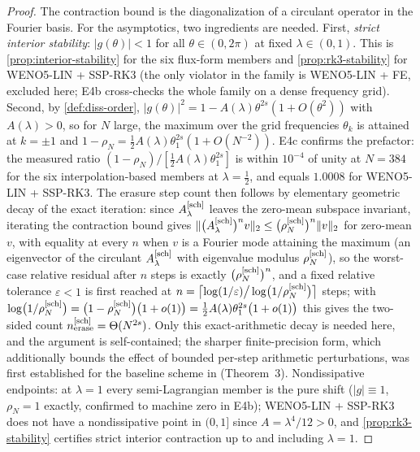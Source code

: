 \documentclass[pdflatex,sn-mathphys-num]{sn-jnl}%
\theoremstyle{thmstyleone}%
\theoremstyle{thmstyletwo}%
\theoremstyle{thmstylethree}%
\newcommand{\Asch}{A^{[\rm sch]}_\lambda}
\begin{document}
\begin{proof}
The contraction bound is the diagonalization of a circulant operator in the Fourier basis.
For the asymptotics, two ingredients are needed.
First, \emph{strict interior stability}: $|g(\theta)|<1$ for all $\theta\in(0,2\pi)$ at fixed $\lambda\in(0,1)$.
This is \cref{prop:interior-stability} for the six flux-form members and \cref{prop:rk3-stability} for WENO5-LIN + SSP-RK3 (the only violator in the family is WENO5-LIN + FE, excluded here; E4b cross-checks the whole family on a dense frequency grid).
Second, by \cref{def:diss-order}, $|g(\theta)|^2=1-A(\lambda)\theta^{2s}(1+O(\theta^2))$ with $A(\lambda)>0$, so for $N$ large, the maximum over the grid frequencies $\theta_k$ is attained at $k=\pm1$ and $1-\rho_N=\tfrac12A(\lambda)\theta_1^{2s}(1+O(N^{-2}))$.
E4c confirms the prefactor: the measured ratio $(1-\rho_N)/[\tfrac12A(\lambda)\theta_1^{2s}]$ is within $10^{-4}$ of unity at $N=384$ for the six interpolation-based members at $\lambda=\tfrac12$, and equals $1.0008$ for WENO5-LIN + SSP-RK3.
The erasure step count then follows by elementary geometric decay of the exact iteration: since $\Asch$ leaves the zero-mean subspace invariant, iterating the contraction bound gives $\|\bigl(\Asch\bigr)^{n}v\|_2\le\bigl(\rho_N^{[\rm sch]}\bigr)^{n}\|v\|_2$ for zero-mean $v$, with equality at every $n$ when $v$ is a Fourier mode attaining the maximum (an eigenvector of the circulant $\Asch$ with eigenvalue modulus $\rho_N^{[\rm sch]}$), so the worst-case relative residual after $n$ steps is exactly $\bigl(\rho_N^{[\rm sch]}\bigr)^{n}$, and a fixed relative tolerance $\varepsilon<1$ is first reached at $n=\bigl\lceil\log(1/\varepsilon)\big/\log\bigl(1/\rho_N^{[\rm sch]}\bigr)\bigr\rceil$ steps; with $\log\bigl(1/\rho_N^{[\rm sch]}\bigr)=\bigl(1-\rho_N^{[\rm sch]}\bigr)\bigl(1+o(1)\bigr)=\tfrac12A(\lambda)\theta_1^{2s}\bigl(1+o(1)\bigr)$ this gives the two-sided count $n_{\rm erase}^{[\rm sch]}=\Theta(N^{2s})$.
Only this exact-arithmetic decay is needed here, and the argument is self-contained; the sharper finite-precision form, which additionally bounds the effect of bounded per-step arithmetic perturbations, was first established for the baseline scheme in \cite{PolemitisChristakisDrikakis2026FVerasure} (Theorem~3).
Nondissipative endpoints: at $\lambda=1$ every semi-Lagrangian member is the pure shift ($|g|\equiv1$, $\rho_N=1$ exactly, confirmed to machine zero in E4b); WENO5-LIN + SSP-RK3 does not have a nondissipative point in $(0,1]$ since $A=\lambda^4/12>0$, and \cref{prop:rk3-stability} certifies strict interior contraction up to and including $\lambda=1$.
\end{proof}
\end{document}
